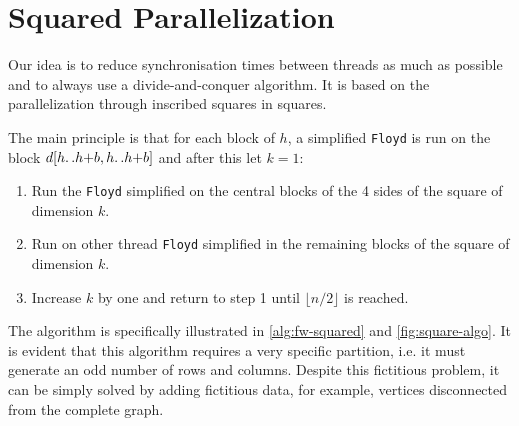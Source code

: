 \section{Squared Parallelization}\label{squared-parallelization}

Our idea is to reduce synchronisation times between threads as much as possible and to always use a divide-and-conquer algorithm. 
It is based on the parallelization through inscribed squares in squares.

The main principle is that for each block of \(h\), a simplified \texttt{Floyd} is run on the block \(d[h{\mathinner {\ldotp \ldotp}}h{+}b,h{\mathinner {\ldotp \ldotp}}h{+}b]\) and after this let \(k=1\):
\begin{enumerate}
    \item Run the \texttt{Floyd} simplified on the central blocks of the 4 sides of the square of dimension \(k\).
    \item Run on other thread \texttt{Floyd} simplified in the remaining blocks of the square of dimension \(k\).
    \item Increase \(k\) by one and return to step 1 until \(\lfloor n/2 \rfloor\) is reached.
\end{enumerate}
The algorithm is specifically illustrated in \cref{alg:fw-squared} and \cref{fig:square-algo}.
It is evident that this algorithm requires a very specific partition, i.e. it must generate an odd number of rows and columns. 
Despite this fictitious problem, it can be simply solved by adding fictitious data, for example, vertices disconnected from the complete graph.
